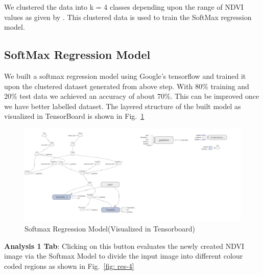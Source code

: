 We clustered the data into k = 4 classes depending upon the range of NDVI values as given by . This clustered data is used to train the SoftMax regression model.


\subsection{SoftMax Regression Model}

We built a softmax regression model using Google’s tensorflow and trained it upon the clustered dataset generated from above step. With 80\% training and 20\% test data we achieved an accuracy of about 70\%. This can be improved once we have better labelled dataset. The layered structure of the built model as visualized in TensorBoard is shown in Fig.~\ref{fig: softmax regression}

\begin{figure}[t]
	\includegraphics[width=1.0\linewidth]{fin_img_12}
	\centering
	\caption{\label{fig: softmax regression}Softmax Regression Model(Visualized in Tensorboard)}
\end{figure}

\textbf{Analysis 1 Tab}: Clicking on this button evaluates the newly created NDVI image via the Softmax Model to divide the input image into different colour coded regions as shown in Fig.~\ref{fig: res-4}

